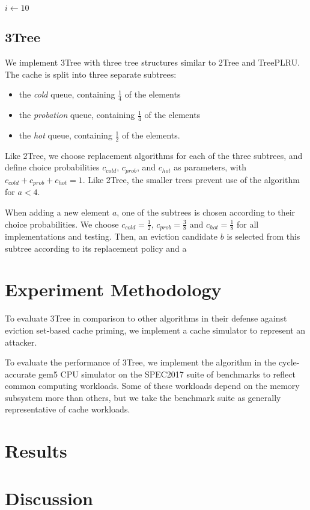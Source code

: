 \documentclass[letterpaper, twocolumn]{article}
\begin{document}
\begin{algorithmic}
  \State $i \gets 10$
\end{algorithmic}

\subsection{3Tree}

We implement 3Tree with three tree structures similar to 2Tree and TreePLRU.
The cache is split into three separate subtrees:
\begin{itemize}
\item the \textit{cold} queue, containing $\frac{1}{4}$ of the elements
\item the \textit{probation} queue, containing $\frac{1}{4}$ of the elements
\item the \textit{hot} queue, containing $\frac{1}{2}$ of the elements.
\end{itemize}
Like 2Tree, we choose replacement algorithms for each of the three subtrees,
and define choice probabilities $c_{cold}$, $c_{prob}$, and $c_{hot}$ as parameters,
with $c_{cold} + c_{prob} + c_{hot} = 1$.
Like 2Tree, the smaller trees prevent use of the algorithm for $a < 4$.

When adding a new element $a$, one of the subtrees is chosen according to their choice probabilities.
We choose $c_{cold} = \frac{1}{2}$, $c_{prob} = \frac{3}{8}$ and $c_{hot} = \frac{1}{8}$
for all implementations and testing.
Then, an eviction candidate $b$ is selected from this subtree according to its replacement policy
and a 

\section{Experiment Methodology}

To evaluate 3Tree in comparison to other algorithms in their defense
against eviction set-based cache priming, %
we implement a cache simulator to represent an attacker.

To evaluate the performance of 3Tree, we implement the algorithm in the
cycle-accurate gem5 CPU simulator on the SPEC2017 suite of benchmarks
to reflect common computing workloads.
Some of these workloads depend on the memory subsystem more than others,
but we take the benchmark suite as generally representative
of cache workloads.

\section{Results}

\section{Discussion}





\end{document}
